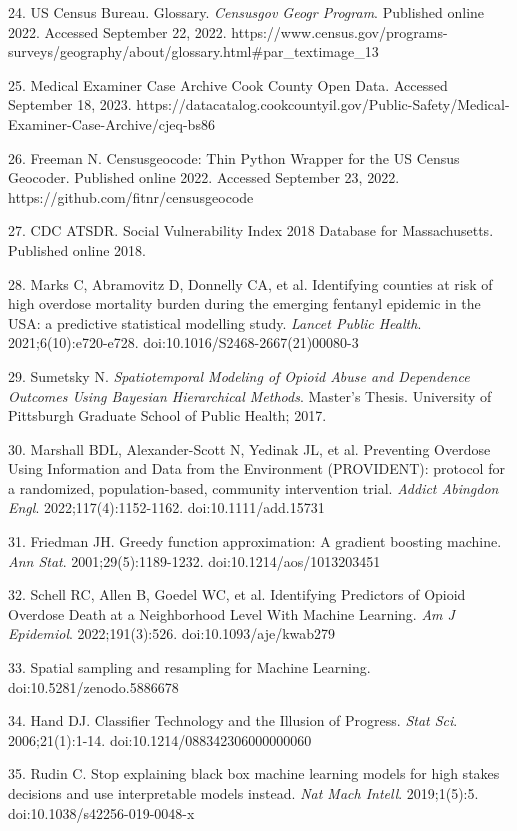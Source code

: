 24. US Census Bureau. Glossary. \emph{Censusgov Geogr Program}. Published online 2022. Accessed September 22, 2022. https://www.census.gov/programs-surveys/geography/about/glossary.html\#par\_textimage\_13

25. Medical Examiner Case Archive \textbar{} Cook County Open Data. Accessed September 18, 2023. https://datacatalog.cookcountyil.gov/Public-Safety/Medical-Examiner-Case-Archive/cjeq-bs86

26. Freeman N. Censusgeocode: Thin Python Wrapper for the US Census Geocoder. Published online 2022. Accessed September 23, 2022. https://github.com/fitnr/censusgeocode

27. CDC ATSDR. Social Vulnerability Index 2018 Database for Massachusetts. Published online 2018.

28. Marks C, Abramovitz D, Donnelly CA, et al. Identifying counties at risk of high overdose mortality burden during the emerging fentanyl epidemic in the USA: a predictive statistical modelling study. \emph{Lancet Public Health}. 2021;6(10):e720-e728. doi:10.1016/S2468-2667(21)00080-3

29. Sumetsky N. \emph{Spatiotemporal Modeling of Opioid Abuse and Dependence Outcomes Using Bayesian Hierarchical Methods}. Master's Thesis. University of Pittsburgh Graduate School of Public Health; 2017.

30. Marshall BDL, Alexander-Scott N, Yedinak JL, et al. Preventing Overdose Using Information and Data from the Environment (PROVIDENT): protocol for a randomized, population-based, community intervention trial. \emph{Addict Abingdon Engl}. 2022;117(4):1152-1162. doi:10.1111/add.15731

31. Friedman JH. Greedy function approximation: A gradient boosting machine. \emph{Ann Stat}. 2001;29(5):1189-1232. doi:10.1214/aos/1013203451

32. Schell RC, Allen B, Goedel WC, et al. Identifying Predictors of Opioid Overdose Death at a Neighborhood Level With Machine Learning. \emph{Am J Epidemiol}. 2022;191(3):526. doi:10.1093/aje/kwab279

33. Spatial sampling and resampling for Machine Learning. doi:10.5281/zenodo.5886678

34. Hand DJ. Classifier Technology and the Illusion of Progress. \emph{Stat Sci}. 2006;21(1):1-14. doi:10.1214/088342306000000060

35. Rudin C. Stop explaining black box machine learning models for high stakes decisions and use interpretable models instead. \emph{Nat Mach Intell}. 2019;1(5):5. doi:10.1038/s42256-019-0048-x

